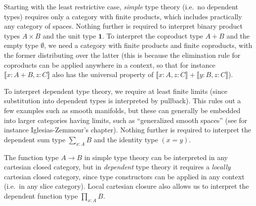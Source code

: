 \documentclass[12pt]{article}
\def\ty{\;\mathsf{type}}
\def\m#1{\llbracket#1\rrbracket}
\def\types{\vdash}
\def\unit{\mathbf{1}}
\numberwithin{equation}{section}
\begin{document}
Starting with the least restrictive case, \emph{simple} type theory (i.e.\ no dependent types) requires only a category with finite products, which includes  %
practically any category of spaces. %
Nothing further is required to interpret binary product types $A\times B$ and the unit type $\unit$.
To interpret the coproduct type $A+B$ and the empty type $\emptyset$, we need a category with finite products and finite coproducts, with the former distributing over the latter (this is because the elimination rule for coproducts can be applied anywhere in a context, so that for instance $\m{x:A+B, z:C}$ also has the universal property of $\m{x:A,z:C} + \m{y:B,z:C}$).

To interpret %
dependent type theory, we require at least finite limits (since substitution into dependent types is interpreted by pullback).
This rules out a few examples such as smooth manifolds, but these can generally be embedded into larger categories having limits, such as ``generalized smooth spaces'' (see for instance Iglesias-Zemmour's chapter).
Nothing further is required to interpret the dependent sum type $\sum_{x:A} B$ and the identity type $(x=y)$.

The function type $A\to B$ in simple type theory can be interpreted in any cartesian closed category, but in \emph{dependent} type theory it requires a \emph{locally} cartesian closed category, since type constructors can be applied in any context (i.e.\ in any slice category). %
Local cartesian closure also allows us to interpret the dependent function type $\prod_{x:A} B$.
\end{document}

